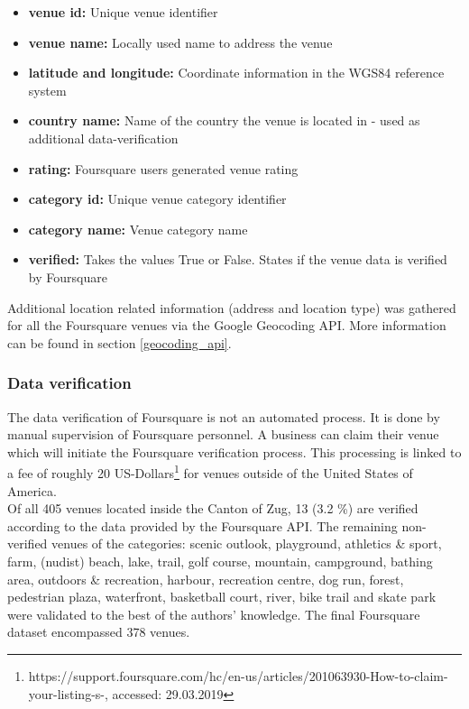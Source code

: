 \begin{itemize}[label={}]
    \item \textbf{venue id:} Unique venue identifier 
    \item \textbf{venue name:} Locally used name to address the venue 
    \item \textbf{latitude and longitude:} Coordinate information in the WGS84 reference system 
    \item \textbf{country name:} Name of the country the venue is located in - used as additional data-verification 
    \item \textbf{rating:} Foursquare users generated venue rating 
    \item \textbf{category id:} Unique venue category identifier 
    \item \textbf{category name:} Venue category name 
    \item \textbf{verified:} Takes the values True or False. States if the venue data is verified by Foursquare 
\end{itemize}

Additional location related information (address and location type) was gathered for all the Foursquare venues via the Google Geocoding API. More information can be found in section \ref{geocoding_api}.

\subsubsection{Data verification} \label{foursquare_data_verification}
The data verification of Foursquare is not an automated process. It is done by manual supervision of Foursquare personnel. A business can claim their venue which will initiate the Foursquare verification process. This processing is linked to a fee of roughly 20 US-Dollars\footnote{https://support.foursquare.com/hc/en-us/articles/201063930-How-to-claim-your-listing-s-, accessed: 29.03.2019} for venues outside of the United States of America. \\
Of all 405 venues located inside the Canton of Zug, 13 (3.2 \%) are verified according to the data provided by the Foursquare API. The remaining non-verified venues of the categories: scenic outlook, playground, athletics \& sport, farm, (nudist) beach, lake, trail, golf course, mountain, campground, bathing area, outdoors \& recreation, harbour, recreation centre, dog run, forest, pedestrian plaza, waterfront, basketball court, river, bike trail and skate park were validated to the best of the authors' knowledge. The final Foursquare dataset encompassed 378 venues.

